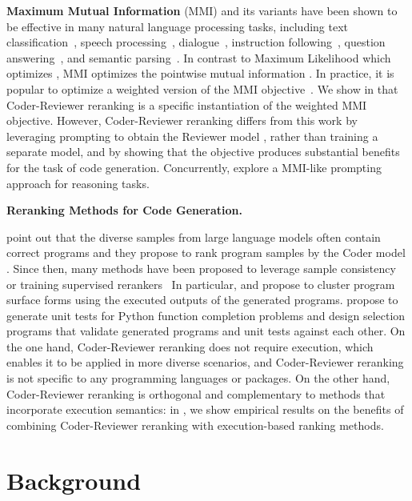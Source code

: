 \documentclass[nohyperref]{article}
\theoremstyle{plain}
\theoremstyle{definition}
\theoremstyle{remark}
\renewcommand{\paragraph}[1]{
     \textbf{#1} 
 }
\begin{document}
\paragraph{Maximum Mutual Information}(MMI) and its variants have been shown to be effective in many natural language processing tasks, including text classification~\citep{noisy-classification}, speech processing~\citep{Bahl1986MaximumMI}, dialogue~\citep{mmi-diversity}, instruction following~\citep{pragmatic-inference}, question answering~\citep{generative-qa}, and semantic parsing~\citep{rerank-parsing}.
In contrast to Maximum Likelihood which optimizes , 
MMI optimizes the pointwise mutual information .
In practice, it is popular to optimize a weighted version of the MMI objective~\cite{mmi-diversity}. We show in  that Coder-Reviewer reranking is a specific instantiation of the weighted MMI objective.
However, Coder-Reviewer reranking differs from this work by
leveraging prompting to obtain the Reviewer model , rather than training a separate model, and by showing that the objective produces substantial benefits for the task of code generation. Concurrently, \citet{flipped} explore a MMI-like prompting approach for reasoning tasks.


\paragraph{Reranking Methods for Code Generation.}
\citet{codex} point out that the diverse samples from large language models often contain correct programs and they propose to rank program samples by the Coder model .
Since then, many methods have been proposed to leverage sample consistency~\citep{mbr} or training supervised rerankers~\citep{fault-aware}
In particular, \citet{mbr} and \citet{alphacode} propose to cluster program surface forms using the executed outputs of the generated programs.
\citet{codet} propose to generate unit tests for Python function completion problems and design selection programs that validate generated programs and unit tests against each other.
On the one hand, Coder-Reviewer reranking does not require execution, which enables it to be applied in more diverse scenarios, and Coder-Reviewer reranking is not specific to any programming languages or packages.
On the other hand, Coder-Reviewer reranking is orthogonal and complementary to methods that incorporate execution semantics:
in , we show empirical results on the benefits of combining Coder-Reviewer reranking with execution-based ranking methods. \section{Background}
\end{document}
